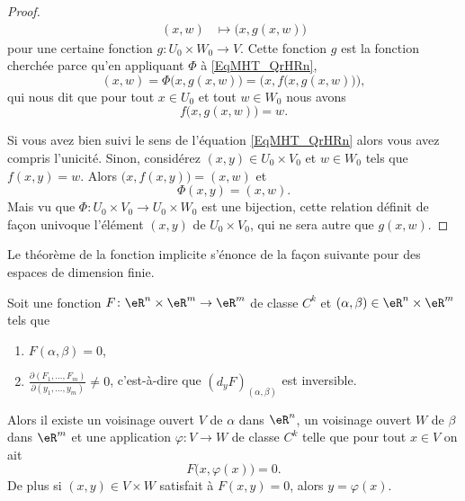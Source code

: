 \begin{proof}
\begin{equation}
\begin{aligned}
			(x,w)                         & \mapsto \big( x,g(x,w) \big)
		\end{aligned}
	\end{equation}
	pour une certaine fonction \( g\colon U_0\times W_0\to V\). Cette fonction \( g\) est la fonction cherchée parce qu'en appliquant \( \Phi\) à \eqref{EqMHT_QrHRn},
	\begin{equation}
		(x,w)=\Phi\big( x,g(x,w) \big)=\Big( x,f\big( x,g(x,w) \big) \Big),
	\end{equation}
	qui nous dit que pour tout \( x\in U_0\) et tout \( w\in W_0\) nous avons
	\begin{equation}
		f\big( x,g(x,w) \big)=w.
	\end{equation}

	Si vous avez bien suivi le sens de l'équation \eqref{EqMHT_QrHRn} alors vous avez compris l'unicité. Sinon, considérez \( (x,y)\in U_0\times V_0\) et \( w\in W_0\) tels que \( f(x,y)=w\). Alors \( \big( x,f(x,y) \big)=(x,w)\) et
	\begin{equation}
		\Phi(x,y)=(x,w).
	\end{equation}
	Mais vu que \( \Phi\colon U_0\times V_0\to U_0\times W_0\) est une bijection, cette relation définit de façon univoque l'élément \( (x,y)\) de \( U_0\times V_0\), qui ne sera autre que \( g(x,w)\).
\end{proof}

Le théorème de la fonction implicite s'énonce de la façon suivante pour des espaces de dimension finie.
\begin{theorem}   \label{ThoRYN_jvZrZ}
	Soit une fonction \( F\colon \eR^n\times \eR^m\to \eR^m\) de classe \( C^k\) et \( (\alpha,\beta)\in \eR^n\times \eR^m\) tels que
	\begin{enumerate}
		\item
		      \( F(\alpha,\beta)=0\),
		\item
		      \( \frac{ \partial (F_1,\ldots, F_m) }{ \partial (y_1,\ldots, y_m) }\neq 0\), c'est-à-dire que \( (d_yF)_{(\alpha,\beta)} \) est inversible.
	\end{enumerate}
	Alors il existe un voisinage ouvert \( V\) de \( \alpha\) dans \( \eR^n\), un voisinage ouvert \( W\) de \( \beta\) dans \( \eR^m\) et une application \( \varphi\colon V\to W\) de classe \( C^k\)  telle que pour tout \( x\in V\) on ait
	\begin{equation}
		F\big( x,\varphi(x) \big)=0.
	\end{equation}
	De plus si \( (x,y)\in V\times W\) satisfait à \( F(x,y)=0\), alors \( y=\varphi(x)\).
\end{theorem}

